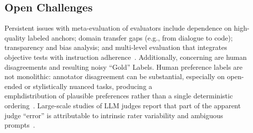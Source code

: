 \subsection{Open Challenges}
Persistent issues with meta-evaluation of evaluators include dependence on high-quality labeled anchors; domain transfer gaps (e.g., from dialogue to code); transparency and bias analysis; and multi-level evaluation that integrates objective tests with instruction adherence~\cite{li2024_llmsasjudges, chen2021evaluating}. Additionally, concerning are human disagreements and resulting noisy ``Gold'' Labels. Human preference labels are not monolithic: annotator disagreement can be substantial, especially on open-ended or stylistically nuanced tasks, producing a \\emph{distribution} of plausible preferences rather than a single deterministic ordering~\cite{stiennon2020learning, ouyang2022training}. Large-scale studies of LLM judges report that part of the apparent judge ``error'' is attributable to intrinsic rater variability and ambiguous prompts~\cite{bavaresco2024judgebench, li2024_llmsasjudges}.